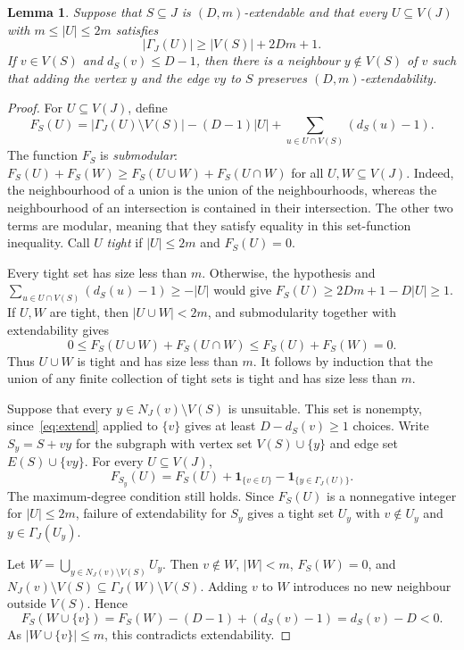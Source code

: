 \documentclass[10pt,letterpaper]{article}
\newtheorem{lemma}[theorem]{Lemma}
\theoremstyle{definition}
\theoremstyle{remark}
\begin{document}
\begin{lemma}\label{lem:leaf}
Suppose that $S\subseteq J$ is $(D,m)$-extendable and that every $U\subseteq V(J)$ with $m\le|U|\le2m$ satisfies
\[
|\Gamma_J(U)|\ge |V(S)|+2Dm+1.
\]
If $v\in V(S)$ and $d_S(v)\le D-1$, then there is a neighbour $y\notin V(S)$ of $v$ such that adding the vertex $y$ and the edge $vy$ to $S$ preserves $(D,m)$-extendability.
\end{lemma}
\begin{proof}
For $U\subseteq V(J)$, define
\[
F_S(U)=|\Gamma_J(U)\setminus V(S)|-(D-1)|U|
+\sum_{u\in U\cap V(S)}(d_S(u)-1).
\]
The function $F_S$ is \emph{submodular}: $F_S(U)+F_S(W)\ge F_S(U\cup W)+F_S(U\cap W)$ for all $U,W\subseteq V(J)$. Indeed, the neighbourhood of a union is the union of the neighbourhoods, whereas the neighbourhood of an intersection is contained in their intersection. The other two terms are modular, meaning that they satisfy equality in this set-function inequality. Call $U$ \emph{tight} if $|U|\le2m$ and $F_S(U)=0$.

Every tight set has size less than $m$. Otherwise, the hypothesis and $\sum_{u\in U\cap V(S)}(d_S(u)-1)\ge-|U|$ would give $F_S(U)\ge2Dm+1-D|U|\ge1$. If $U,W$ are tight, then $|U\cup W|<2m$, and submodularity together with extendability gives
\[
0\le F_S(U\cup W)+F_S(U\cap W)\le F_S(U)+F_S(W)=0.
\]
Thus $U\cup W$ is tight and has size less than $m$. It follows by induction that the union of any finite collection of tight sets is tight and has size less than $m$.

Suppose that every $y\in N_J(v)\setminus V(S)$ is unsuitable. This set is nonempty, since~\eqref{eq:extend} applied to $\{v\}$ gives at least $D-d_S(v)\ge1$ choices. Write $S_y=S+vy$ for the subgraph with vertex set $V(S)\cup\{y\}$ and edge set $E(S)\cup\{vy\}$. For every $U\subseteq V(J)$,
\[
F_{S_y}(U)=F_S(U)+\mathbf1_{\{v\in U\}}-\mathbf1_{\{y\in\Gamma_J(U)\}}.
\]
The maximum-degree condition still holds. Since $F_S(U)$ is a nonnegative integer for $|U|\le2m$, failure of extendability for $S_y$ gives a tight set $U_y$ with $v\notin U_y$ and $y\in\Gamma_J(U_y)$.

Let $W=\bigcup_{y\in N_J(v)\setminus V(S)}U_y$. Then $v\notin W$, $|W|<m$, $F_S(W)=0$, and $N_J(v)\setminus V(S)\subseteq\Gamma_J(W)\setminus V(S)$. Adding $v$ to $W$ introduces no new neighbour outside $V(S)$. Hence
\[
F_S(W\cup\{v\})=F_S(W)-(D-1)+(d_S(v)-1)=d_S(v)-D<0.
\]
As $|W\cup\{v\}|\le m$, this contradicts extendability.
\end{proof}
\end{document}
